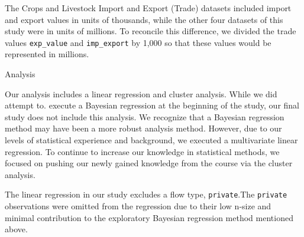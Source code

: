 \documentclass[
]{article}
\begin{document}
The Crops and Livestock Import and Export (Trade) datasets included
import and export values in units of thousands, while the other four
datasets of this study were in units of millions. To reconcile this
difference, we divided the trade values \texttt{exp\_value} and
\texttt{imp\_export} by 1,000 so that these values would be represented
in millions.

Analysis

Our analysis includes a linear regression and cluster analysis. While we
did attempt to. execute a Bayesian regression at the beginning of the
study, our final study does not include this analysis. We recognize that
a Bayesian regression method may have been a more robust analysis
method. However, due to our levels of statistical experience and
background, we executed a multivariate linear regression. To continue to
increase our knowledge in statistical methods, we focused on pushing our
newly gained knowledge from the course via the cluster analysis.

The linear regression in our study excludes a flow type,
\texttt{private}.The \texttt{private} observations were omitted from the
regression due to their low n-size and minimal contribution to the
exploratory Bayesian regression method mentioned above.
\end{document}
